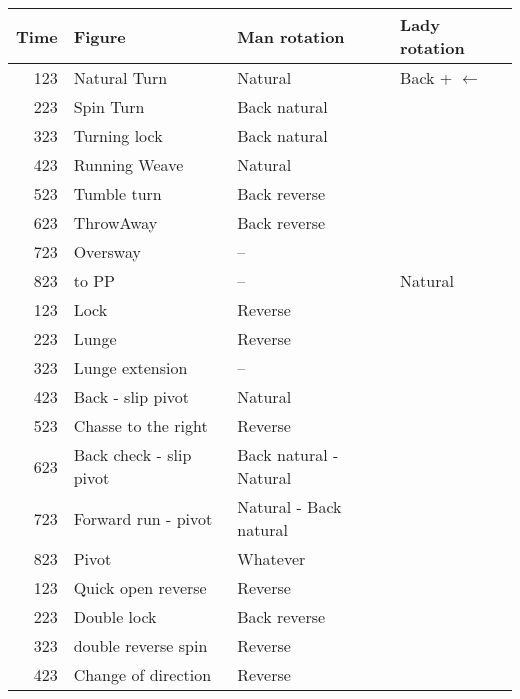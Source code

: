 \documentclass[10pt]{article}
\begin{document}
\begin{tabular}{r l l l}
    \toprule
    Time & Figure                  & Man rotation           & Lady rotation       \\
    \midrule
    123  & Natural Turn            & Natural                & Back + $\leftarrow$ \\
    223  & Spin Turn               & Back natural           &                     \\
    323  & Turning lock            & Back natural           &                     \\
    423  & Running Weave           & Natural                &                     \\
    523  & Tumble turn             & Back reverse           &                     \\
    623  & ThrowAway               & Back reverse           &                     \\
    723  & Oversway                & --                     &                     \\
    823  & to PP                   & --                     & Natural             \\
    123  & Lock                    & Reverse                &                     \\
    223  & Lunge                   & Reverse                &                     \\
    323  & Lunge extension         & --                     &                     \\
    423  & Back - slip pivot       & Natural                &                     \\
    523  & Chasse to the right     & Reverse                &                     \\
    623  & Back check - slip pivot & Back natural - Natural &                     \\
    723  & Forward run - pivot     & Natural - Back natural &                     \\
    823  & Pivot                   & Whatever               &                     \\
    123  & Quick open reverse      & Reverse                &                     \\
    223  & Double lock             & Back reverse           &                     \\
    323  & double reverse spin     & Reverse                &                     \\
    423  & Change of direction     & Reverse                &                     \\

\end{tabular}
\end{document}

